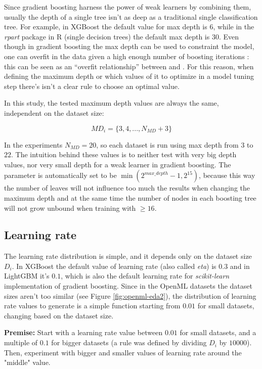 Since gradient boosting harness the power of weak learners by combining them, usually the depth of a single tree isn't as deep as a traditional single classification tree. For example, in XGBoost the default value for max depth is $6$, while in the \textit{rpart} package in R (single decision trees) the default max depth is $30$. Even though in gradient boosting the max depth can be used to constraint the model, one can overfit in the data given a high enough number of boosting iterations : this can be seen as an ``overfit relationship'' between  and . For this reason, when defining the maximum depth or which values of it to optimize in a model tuning step there's isn't a clear rule to choose an optimal value. 

In this study, the tested maximum depth values are always the same, independent on the dataset size:

$$MD_i = \{3, 4, ..., N_{MD} + 3\}$$

In the experiments $N_{MD} = 20$, so each dataset is run using max depth from $3$ to $22$. The intuition behind these values is to neither test with very big depth values, nor very small depth for a weak learner in gradient boosting. The  parameter is automatically set to be $\min(2^{max\_depth} - 1, 2^{15})$, because this way the number of leaves will not influence too much the results when changing the maximum depth and at the same time the number of nodes in each boosting tree will not grow unbound when training with  $\geq 16$.

\subsection{Learning rate}

The learning rate distribution is simple, and it depends only on the dataset size $D_i$. In XGBoost the default value of learning rate (also called \textit{eta}) is $0.3$ and in LightGBM it's $0.1$, which is also the default learning rate for \textit{scikit-learn} implementation of gradient boosting. Since in the OpenML datasets the dataset sizes aren't too similar (see Figure \ref{fig:openml-eda2}), the distribution of learning rate values to generate is a simple function starting from $0.01$ for small datasets, changing based on the dataset size.

\textbf{Premise:} Start with a learning rate value between $0.01$ for small datasets, and a multiple of $0.1$ for bigger datasets (a rule was defined by dividing $D_i$ by $10000$). Then, experiment with bigger and smaller values of learning rate around the "middle" value.

